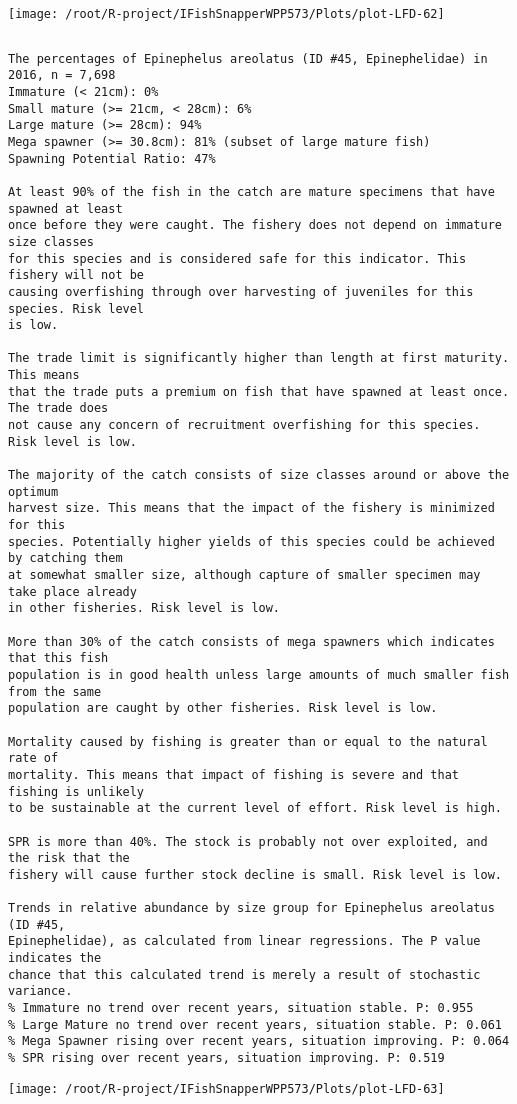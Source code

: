 \documentclass{report}\usepackage[]{graphicx}\usepackage[]{color}
\makeatletter
\def\maxwidth{ %
  \ifdim\Gin@nat@width>\linewidth
    \linewidth
  \else
    \Gin@nat@width
  \fi
}
\newenvironment{kframe}{%
 \def\at@end@of@kframe{}%
 \ifinner\ifhmode%
  \def\at@end@of@kframe{\end{minipage}}%
  \begin{minipage}{\columnwidth}%
 \fi\fi%
 \def\FrameCommand##1{\hskip\@totalleftmargin \hskip-\fboxsep
 \colorbox{shadecolor}{##1}\hskip-\fboxsep
     \hskip-\linewidth \hskip-\@totalleftmargin \hskip\columnwidth}%
 \MakeFramed {\advance\hsize-\width
   \@totalleftmargin\z@ \linewidth\hsize
   \@setminipage}}%
 {\par\unskip\endMakeFramed%
 \at@end@of@kframe}
\newenvironment{knitrout}{}{} %
\makeatother
\begin{document}
\begin{knitrout}
\texttt{[image: /root/R-project/IFishSnapperWPP573/Plots/plot-LFD-62]} 
\begin{kframe}\begin{verbatim}
\end{verbatim}
\end{kframe}
\clearpage
\newpage
\begin{kframe}\begin{verbatim}The percentages of Epinephelus areolatus (ID #45, Epinephelidae) in 2016, n = 7,698
Immature (< 21cm): 0%
Small mature (>= 21cm, < 28cm): 6%
Large mature (>= 28cm): 94%
Mega spawner (>= 30.8cm): 81% (subset of large mature fish)
Spawning Potential Ratio: 47%
 
At least 90% of the fish in the catch are mature specimens that have spawned at least
once before they were caught. The fishery does not depend on immature size classes
for this species and is considered safe for this indicator. This fishery will not be
causing overfishing through over harvesting of juveniles for this species. Risk level
is low.

The trade limit is significantly higher than length at first maturity.  This means
that the trade puts a premium on fish that have spawned at least once. The trade does
not cause any concern of recruitment overfishing for this species. Risk level is low.

The majority of the catch consists of size classes around or above the optimum
harvest size. This means that the impact of the fishery is minimized for this
species. Potentially higher yields of this species could be achieved by catching them
at somewhat smaller size, although capture of smaller specimen may take place already
in other fisheries. Risk level is low.

More than 30% of the catch consists of mega spawners which indicates that this fish
population is in good health unless large amounts of much smaller fish from the same
population are caught by other fisheries. Risk level is low.
 
Mortality caused by fishing is greater than or equal to the natural rate of
mortality. This means that impact of fishing is severe and that fishing is unlikely
to be sustainable at the current level of effort. Risk level is high.
 
SPR is more than 40%. The stock is probably not over exploited, and the risk that the
fishery will cause further stock decline is small. Risk level is low.
 
Trends in relative abundance by size group for Epinephelus areolatus (ID #45,
Epinephelidae), as calculated from linear regressions. The P value indicates the
chance that this calculated trend is merely a result of stochastic variance.
% Immature no trend over recent years, situation stable. P: 0.955
% Large Mature no trend over recent years, situation stable. P: 0.061
% Mega Spawner rising over recent years, situation improving. P: 0.064
% SPR rising over recent years, situation improving. P: 0.519
\end{verbatim}
\end{kframe}
\texttt{[image: /root/R-project/IFishSnapperWPP573/Plots/plot-LFD-63]} 


\end{knitrout}
\end{document}
